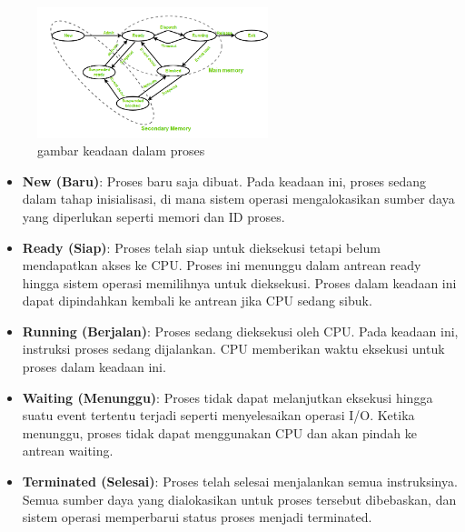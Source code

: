 \documentclass[12pt]{article}
\begin{document}
\begin{figure}[h]
        \centering
        \includegraphics[width=0.6\textwidth]{asset/gambar_keadaan_proses.png}
        \caption{gambar keadaan dalam proses}
\end{figure}

\begin{itemize}
    \item \textbf{New (Baru)}: Proses baru saja dibuat. Pada keadaan ini, proses sedang dalam tahap inisialisasi, di mana sistem operasi mengalokasikan sumber daya yang diperlukan seperti memori dan ID proses.
    \item \textbf{Ready (Siap)}: Proses telah siap untuk dieksekusi tetapi belum mendapatkan akses ke CPU. Proses ini menunggu dalam antrean ready hingga sistem operasi memilihnya untuk dieksekusi. Proses dalam keadaan ini dapat dipindahkan kembali ke antrean jika CPU sedang sibuk.
    \item \textbf{Running (Berjalan)}: Proses sedang dieksekusi oleh CPU. Pada keadaan ini, instruksi proses sedang dijalankan. CPU memberikan waktu eksekusi untuk proses dalam keadaan ini.
    \item \textbf{Waiting (Menunggu)}: Proses tidak dapat melanjutkan eksekusi hingga suatu event tertentu terjadi seperti menyelesaikan operasi I/O. Ketika menunggu, proses tidak dapat menggunakan CPU dan akan pindah ke antrean waiting.
    \item \textbf{Terminated (Selesai)}: Proses telah selesai menjalankan semua instruksinya. Semua sumber daya yang dialokasikan untuk proses tersebut dibebaskan, dan sistem operasi memperbarui status proses menjadi terminated.
\end{itemize}
\end{document}
